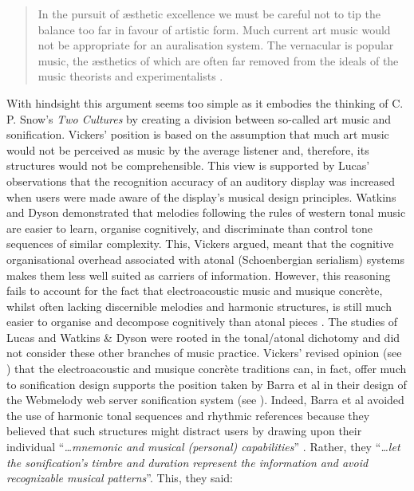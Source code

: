 \documentclass{article}
\begin{document}
\begin{quotation}In the pursuit of æsthetic excellence we must be careful not to tip the balance too far in favour of artistic form. Much current art music would not be appropriate for an auralisation system. The vernacular is popular music, the æsthetics of which are often far removed from the ideals of the music theorists and experimentalists \cite{Vickers:2004a}.
\end{quotation}
With hindsight this argument seems too simple as it embodies the thinking of C. P. Snow's \textit{Two Cultures} by creating a division between so-called art music and sonification. Vickers' position is based on the assumption that much art music would not be perceived as music by the average listener and, therefore, its structures would not be comprehensible. This view is supported by Lucas' observations \cite{Lucas:1994} that the recognition accuracy of an auditory display was increased when users were made aware of the display's musical design principles. Watkins and Dyson \cite{Watkins:1985} demonstrated that melodies following the rules of western tonal music are easier to learn, organise cognitively, and discriminate than control tone sequences of similar complexity. This, Vickers argued, meant that the cognitive organisational overhead associated with atonal (Schoenbergian serialism) systems makes them less well suited as carriers of information. However, this reasoning fails to account for the fact that electroacoustic music and musique concrète, whilst often lacking discernible melodies and harmonic structures, is still much easier to organise and decompose cognitively than atonal pieces \cite{Vickers:2005b}. The studies of Lucas \cite{Lucas:1994} and Watkins \& Dyson \cite{Watkins:1985} were rooted in the tonal/atonal dichotomy and did not consider these other branches of music practice. Vickers' revised opinion (see \cite{Vickers:2005b}) that the electroacoustic and musique concrète traditions can, in fact, offer much to sonification design supports the position taken by Barra et al in their design of the {\sc Webmelody} web server sonification system (see \cite{Barra:2002}). Indeed, Barra et al avoided the use of harmonic tonal sequences and rhythmic references because they believed that such structures might distract users by drawing upon their individual ``\textit{…mnemonic and musical (personal) capabilities}'' \cite{Barra:2002}. Rather, they ``\textit{\ldots let the sonification's timbre and duration represent the information and avoid recognizable musical patterns}''. This, they said:
\end{document}
